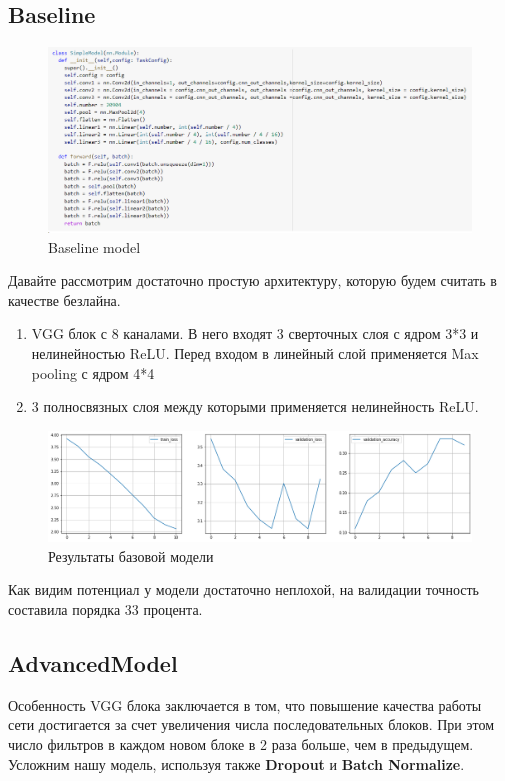 \documentclass[a4paper,12pt]{article}
\begin{document}
	\subsection{Baseline}
		
	\begin{figure}[H]
		\centering
		\includegraphics[width=1\linewidth]{Image/Simple_model}
		\caption{Baseline model}
		\label{fig:simplemodel}
	\end{figure}

	
	Давайте рассмотрим достаточно простую архитектуру, которую будем считать в качестве безлайна. 
	\begin{enumerate}
		\item VGG блок с 8 каналами. В него входят 3 сверточных слоя с ядром 3*3 и нелинейностью ReLU. Перед входом в линейный слой применяется Max pooling с ядром 4*4
		\item 3 полносвязных слоя между которыми применяется нелинейность ReLU.		
	\end{enumerate}
		\begin{figure}[H]
		\centering
		\includegraphics[width=1.2\linewidth]{Image/Baseline_train.png}
		\caption{Результаты базовой модели}
		\label{fig:featurizer1}
	\end{figure}
	Как видим потенциал у модели достаточно неплохой, на валидации точность составила порядка 33 процента. 
	\subsection{AdvancedModel}
		Особенность VGG блока заключается в том, что повышение качества работы сети достигается за счет увеличения числа последовательных блоков. При этом число фильтров в каждом новом блоке в 2 раза больше, чем в предыдущем. Усложним нашу модель, используя также \textbf{Dropout} и \textbf{Batch Normalize}.
		
\end{document}
